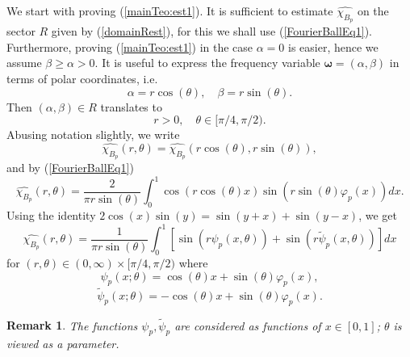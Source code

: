 \documentclass{amsart}
\newtheorem{rem}[theorem]{Remark}
\numberwithin{equation}{section}
\begin{document}
We start with proving (\ref{mainTeo:est1}). It is sufficient to estimate $\widehat{\chi_{B_p}}$ on the sector $R$ given by (\ref{domainRest}), for this we shall use (\ref{FourierBallEq1}). Furthermore, proving (\ref{mainTeo:est1}) in the case $\alpha=0$ is easier, hence we assume $\beta\ge\alpha>0$.
It is useful to express the frequency variable $\boldsymbol{\omega}=(\alpha,\beta)$ in terms of polar coordinates, i.e.
$$
\alpha=r\cos(\theta),\quad \beta=r\sin(\theta).
$$
Then $(\alpha,\beta)\in R$ translates to
$$
r>0,\quad \theta\in[\pi/4,\pi/2).
$$
Abusing notation slightly, we write
$$
\widehat{\chi_{B_p}}(r,\theta)=\widehat{\chi_{B_p}}(r\cos(\theta),r\sin(\theta)),
$$
and by (\ref{FourierBallEq1})
$$
\widehat{\chi_{B_p}}(r,\theta)=\frac{2}{\pi r\sin(\theta)}\int_0^1\cos(r\cos(\theta)x)\sin(r\sin(\theta)\varphi_p(x))dx.
$$
Using the identity $2\cos(x)\sin(y)=\sin(y+x)+\sin(y-x)$, we get
\begin{equation}
    \label{fourierExpression}
    \widehat{\chi_{B_p}}(r,\theta)=\frac{1}{\pi r\sin(\theta)}\int_0^1 \left[\sin(r\psi_p(x,\theta))+\sin(r\widetilde{\psi}_p(x,\theta))\right]dx
\end{equation}
for $(r,\theta)\in(0,\infty)\times[\pi/4,\pi/2)$ where
$$
\psi_p(x;\theta)=\cos(\theta)x+\sin(\theta)\varphi_p(x),
$$
$$
\widetilde{\psi}_p(x;\theta)=-\cos(\theta)x+\sin(\theta)\varphi_p(x).
$$
\begin{rem}
The functions $\psi_p,\widetilde{\psi}_p$ are considered as functions of $x\in [0,1]$; $\theta$ is viewed as a parameter.
\end{rem}
\end{document}
